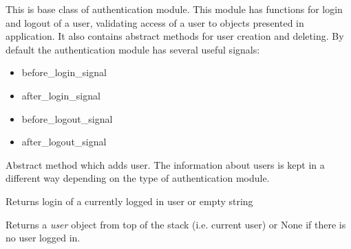 \documentclass[letterpaper,10pt,english]{sphinxmanual}
\begin{document}
\begin{fulllineitems}
\label{sysmod:pyfrid.modules.system.auth.core.auth.BaseAuthModule}
This is base class of authentication module. This module has functions for login and logout of a user, validating access of a user to
objects presented in application. It also contains abstract methods for user creation and deleting.
By default the authentication module has several useful signals:
\begin{itemize}
\item {} 
before\_login\_signal

\item {} 
after\_login\_signal

\item {} 
before\_logout\_signal

\item {} 
after\_logout\_signal

\end{itemize}

\begin{fulllineitems}
\label{sysmod:pyfrid.modules.system.auth.core.auth.BaseAuthModule.add_user}
Abstract method which adds user. The information about users is kept
in a different way depending on the type of authentication module.

\end{fulllineitems}


\begin{fulllineitems}
\label{sysmod:pyfrid.modules.system.auth.core.auth.BaseAuthModule.current_login}
Returns login of a currently logged in user or empty string

\end{fulllineitems}


\begin{fulllineitems}
\label{sysmod:pyfrid.modules.system.auth.core.auth.BaseAuthModule.current_user}
Returns a \emph{user} object from top of the stack (i.e. current user) or None if there is no user logged in.


\end{fulllineitems}
\end{fulllineitems}
\end{document}
